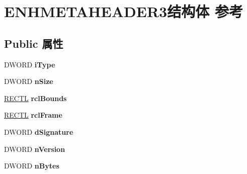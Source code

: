 \hypertarget{struct_e_n_h_m_e_t_a_h_e_a_d_e_r3}{}\section{E\+N\+H\+M\+E\+T\+A\+H\+E\+A\+D\+E\+R3结构体 参考}
\label{struct_e_n_h_m_e_t_a_h_e_a_d_e_r3}
\subsection*{Public 属性}
\begin{DoxyCompactItemize}
\item 
\mbox{\label{struct_e_n_h_m_e_t_a_h_e_a_d_e_r3_a8bf548afd2e5a9dc62a57f264430b3e1}} 
D\+W\+O\+RD {\bfseries i\+Type}
\item 
\mbox{\label{struct_e_n_h_m_e_t_a_h_e_a_d_e_r3_a969a932a3ffc60384885e8751c65f81d}} 
D\+W\+O\+RD {\bfseries n\+Size}
\item 
\mbox{\label{struct_e_n_h_m_e_t_a_h_e_a_d_e_r3_ad5c7baa01e9f4cff189724e82a61bb08}} 
\hyperlink{struct___r_e_c_t_l}{R\+E\+C\+TL} {\bfseries rcl\+Bounds}
\item 
\mbox{\label{struct_e_n_h_m_e_t_a_h_e_a_d_e_r3_a98a1280f0fce934fbcf4c3bb2b70ef9f}} 
\hyperlink{struct___r_e_c_t_l}{R\+E\+C\+TL} {\bfseries rcl\+Frame}
\item 
\mbox{\label{struct_e_n_h_m_e_t_a_h_e_a_d_e_r3_a67a617ed445252e9587fafd56d3dbb4c}} 
D\+W\+O\+RD {\bfseries d\+Signature}
\item 
\mbox{\label{struct_e_n_h_m_e_t_a_h_e_a_d_e_r3_ab36d2981d9c00b3e6b0986d95b7e3a32}} 
D\+W\+O\+RD {\bfseries n\+Version}
\item 
\mbox{\label{struct_e_n_h_m_e_t_a_h_e_a_d_e_r3_ae8183703aa8736b15fd487e9de8c9a76}} 
D\+W\+O\+RD {\bfseries n\+Bytes}
\item 
\mbox{\label{struct_e_n_h_m_e_t_a_h_e_a_d_e_r3_a16a78ff11d761e124032cb68e720437a}} 

\end{DoxyCompactItemize}

